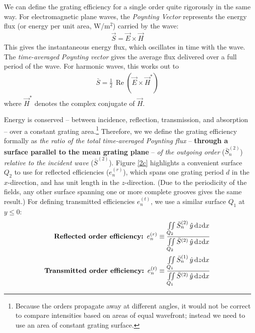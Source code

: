 We can define the grating efficiency for a single order quite rigorously in the same way.  For electromagnetic plane waves, the \emph{Poynting Vector} represents the energy flux (or energy per unit area, W/m$^2$) carried by the wave:
\begin{align}
\vec S = \vec E \times \vec H
\end{align}
This gives the instantaneous energy flux, which oscillates in time with the wave.  The \emph{time-averaged Poynting vector} gives the average flux delivered over a full period of the wave.  For harmonic waves, this works out to
\begin{align}
 \bar S  = \frac{1}{2}\, \operatorname{Re} \left( \vec E \times \vec H^\ast \right)
\end{align}
where $\vec H^\ast$ denotes the complex conjugate of $\vec H$.

Energy is conserved -- between incidence, reflection, transmission, and absorption -- over a constant grating area.\footnote{Because the orders propagate away at different angles, it would not be correct to compare intensities based on areas of equal wavefront; instead we need to use an area of constant grating surface.}  Therefore, we we define the grating efficiency formally as \emph{the ratio of the total time-averaged Poynting flux} -- \textbf{through a surface parallel to the mean grating plane} -- \emph{of the outgoing order }($\bar S_n^{(2)}$) \emph{relative to the incident wave} ($\bar S^{(2)}$).  Figure \ref{2c} highlights a convenient surface $Q_2$ to use for reflected efficiencies ($e_n^{(r)}$), which spans one grating period $d$ in the $x$-direction, and has unit length in the $z$-direction.  (Due to the periodicity of the fields, any other surface spanning one or more complete grooves gives the same result.)  For defining transmitted efficiencies $e_n^{(t)}$, we use a similar surface $Q_1$ at $y\leq0$:
\begin{align}
\textrm{\textbf{Reflected order efficiency: }}e_n^{(r)} &\equiv \frac{\iint \limits_{Q_2} \bar S_n^{(2)} \, \hat y \, \mathrm{d} z \mathrm{d} x}{ \iint \limits_{Q_2} \bar S^{(2)} \, \hat y \, \mathrm{d} z \mathrm{d} x} \\
\textrm{\textbf{Transmitted order efficiency: }}e_n^{(t)} &\equiv\frac{\iint \limits_{Q_1} \bar S_n^{(1)}\, \hat y \, \mathrm{d} z \mathrm{d} x}{ \iint \limits_{Q_1} \bar S^{(2)}\, \hat y \, \mathrm{d} z \mathrm{d} x}
\end{align}
          

